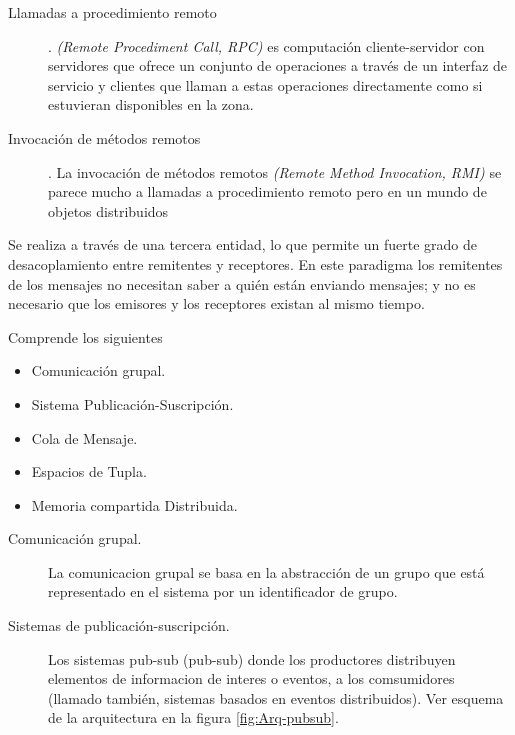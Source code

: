 \begin{description}
\begin{description}
		\item[Llamadas a procedimiento remoto].  \textit{(Remote Procediment Call, RPC)} es computación cliente-servidor con servidores que ofrece un conjunto de operaciones a través de un interfaz de servicio y clientes que llaman a estas operaciones directamente como si estuvieran disponibles en la zona.  
		
		\item [Invocación de métodos remotos]. La invocación de métodos remotos \textit{(Remote Method Invocation, RMI)} se parece mucho a llamadas a procedimiento remoto pero en un mundo de objetos distribuidos  
	
	\end{description}
	
	\item[Comunicaci\'n Indirecta] Se realiza a  través de una tercera entidad, lo que permite un fuerte grado de desacoplamiento entre remitentes y receptores. En este paradigma los remitentes de los mensajes no necesitan saber a quién están enviando mensajes; y no es necesario que los emisores y los receptores existan al mismo tiempo. 
	 
	
		\begin{kaobox}[frametitle=Comunicaci\'on indirecta]
			Comprende los siguientes 
			\begin{itemize}
				\item Comunicación grupal.  				
				\item Sistema Publicación-Suscripción.
				\item Cola de Mensaje.
				\item Espacios de Tupla.
				\item Memoria compartida Distribuida.
			\end{itemize} 	\end{kaobox}  	 
	
	
	\begin{description}		
		\item[ Comunicaci\'on grupal.]  La \gls{comunicacion grupal} se basa en la abstracción de un grupo que está representado en el sistema por un identificador de grupo.  
		
		\item[Sistemas de publicaci\'on-suscripci\'on.]  Los sistemas pub-sub (\gls{pub-sub})  donde los productores   distribuyen elementos de informacion de interes o eventos, a los comsumidores (llamado tambi\'en, sistemas basados en eventos distribuidos). Ver esquema de la arquitectura en la figura \ref{fig:Arq-pubsub}.     
		

\end{description}
\end{description}
